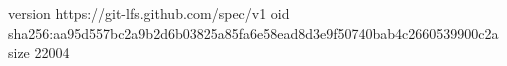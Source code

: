 version https://git-lfs.github.com/spec/v1
oid sha256:aa95d557bc2a9b2d6b03825a85fa6e58ead8d3e9f50740bab4c2660539900c2a
size 22004
